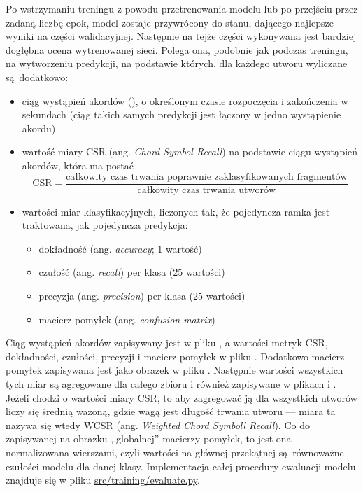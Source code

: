 Po wstrzymaniu treningu z powodu przetrenowania modelu lub po przejściu przez zadaną liczbę epok, model zostaje przywrócony do stanu, dającego najlepsze wyniki na części walidacyjnej. Następnie na tejże części wykonywana jest bardziej dogłębna ocena wytrenowanej sieci. Polega ona, podobnie jak podczas treningu, na wytworzeniu predykcji, na podstawie których, dla każdego utworu wyliczane są dodatkowo: 
\begin{itemize}
    \item ciąg wystąpień akordów (), o określonym czasie rozpoczęcia i
        zakończenia w sekundach (ciąg takich samych predykcji jest łączony w jedno wystąpienie
        akordu)
    \item wartość miary CSR (ang. \emph{Chord Symbol Recall}) na podstawie
        ciągu wystąpień akordów, która ma postać
        \begin{displaymath}
            \textrm{CSR} = \frac
                        {\textrm{całkowity czas trwania poprawnie zaklasyfikowanych fragmentów}}
                        {\textrm{całkowity czas trwania utworów}}
        \end{displaymath}
    \item wartości miar klasyfikacyjnych, liczonych tak, że pojedyncza ramka jest traktowana, jak
        pojedyncza predykcja:
        \begin{itemize}
            \item dokładność (ang. \emph{accuracy}; $1$ wartość)
            \item czułość (ang. \emph{recall}) per klasa ($25$ wartości)
            \item precyzja (ang. \emph{precision}) per klasa ($25$ wartości)
            \item macierz pomyłek (ang. \emph{confusion matrix})
        \end{itemize}
\end{itemize}
Ciąg wystąpień akordów zapisywany jest w pliku , a wartości metryk CSR, dokładności, czułości, precyzji i macierz pomyłek w pliku . Dodatkowo macierz pomyłek zapisywana jest jako obrazek w pliku . Następnie wartości wszystkich tych miar są agregowane dla całego zbioru i również zapisywane w plikach  i . Jeżeli chodzi o wartości miary CSR, to aby zagregować ją dla wszystkich utworów liczy się średnią ważoną, gdzie wagą jest długość trwania utworu --- miara ta nazywa się wtedy WCSR (ang. \emph{Weighted Chord Symboll Recall}). Co do zapisywanej na obrazku ,,globalnej'' macierzy pomyłek, to jest ona normalizowana wierszami, czyli wartości na głównej przekątnej są równoważne czułości modelu dla danej klasy. Implementacja całej procedury ewaluacji modelu znajduje się w pliku \url{src/training/evaluate.py}.

